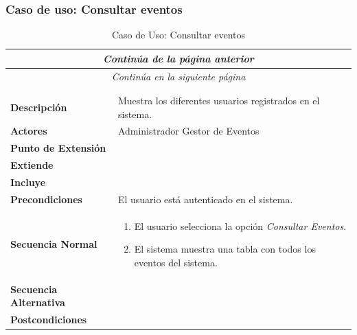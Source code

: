 \newpage
\subsubsection*{Caso de uso: Consultar eventos }
\begin{longtable}{| p{4cm} | p{10cm} |}
\endfirsthead
\multicolumn{2}{c}{\textit{Continúa de la página anterior}}\\[12pt]
\hline
\endhead
\hline
\multicolumn{2}{c}{\textit{Continúa en la siguiente página}} \\
\endfoot
\hline
\caption{Caso de Uso: Consultar eventos}\label{fig:1}\\
\endlastfoot


\hline
\multicolumn{2}{|c|}{\textbf{CU$<$38$>$ - Consultar Eventos}} \\

\hline
\textbf{Descripción} &
Muestra los diferentes usuarios registrados en el sistema.\\

\hline
\textbf{Actores} &
Administrador\newline
Gestor de Eventos\\

\hline
\textbf{Punto de Extensión} &
\\

\hline
\textbf{Extiende} &
\\

\hline
\textbf{Incluye} &
\\

\hline
\textbf{Precondiciones} &
El usuario está autenticado en el sistema.\\

\hline
\textbf{Secuencia Normal} &\mbox{}\par\vspace{-\baselineskip}
\begin{enumerate}[leftmargin=0.7cm, topsep=0.1cm]
\item El usuario selecciona la opción \textit{Consultar Eventos}.
\item El sistema muestra una tabla con todos los eventos del sistema.
\end{enumerate}


\\
\hline
\textbf{Secuencia Alternativa} &\mbox{}\par\vspace{-\baselineskip}
\\

\hline
\textbf{Postcondiciones} & \\
\hline
\end{longtable}



